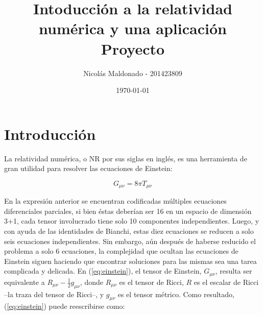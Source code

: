 \documentclass[%
 reprint,
 amsmath,amssymb,
 aps,
floatfix,
]{revtex4-1}
\begin{document}

\title{Intoducción a la relatividad numérica y una aplicación \\
\small{Proyecto}}%

\author{Nicolás Maldonado - 201423809}%
%

\date{\today}%

\begin{abstract}

\end{abstract}

\maketitle


\section{Introducción}

La relatividad numérica, o NR por sus siglas en inglés, es una herramienta de gran utilidad para resolver las ecuaciones de Einstein:%

\begin{equation}\label{eq:einstein}%
    G_{\mu \nu} = 8\pi T_{\mu \nu}%
\end{equation}%

En la expresión anterior se encuentran codificadas múltiples ecuaciones diferenciales parciales, si bien éstas deberían ser 16 en un espacio de dimensión 3+1, cada tensor involucrado tiene solo 10 componentes independientes. Luego, y con ayuda de las identidades de Bianchi, estas diez ecuaciones se reducen a solo seis ecuaciones independientes. Sin embargo, aún después de haberse reducido el problema a solo 6 ecuaciones, la complejidad que ocultan las ecuaciones de Einstein siguen haciendo que encontrar soluciones para las mismas sea una tarea complicada y delicada.
En (\ref{eq:einstein}), el tensor de Einstein, $G_{\mu \nu}$, resulta ser equivalente a $R_{\mu \nu}-\frac{1}{2}g_{\mu \nu}$, donde $R_{\mu \nu}$ es el tensor de Ricci, $R$ es el escalar de Ricci --la traza del tensor de Ricci--, y $g_{\mu\nu}$ es el tensor métrico. Como resultado, (\ref{eq:einstein}) puede reescribirse como:
\end{document}

